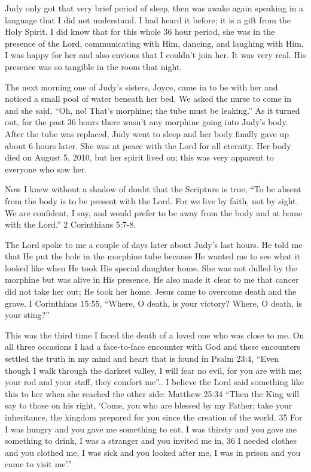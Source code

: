 \documentclass[twoside, 12pt]{book}
\begin{document}
Judy only got that very  brief period of sleep, then was awake again speaking in a language that I did not understand. I had heard it before; it is a gift from the Holy Spirit. I did know that for this whole 36 hour period, she was in the presence of the Lord, communicating with Him, dancing, and laughing with Him. I was happy for her and also envious that I couldn’t join her. It was very real. His presence was so tangible in the room that night. 

The next morning one of Judy’s sisters, Joyce, came in to be with her and noticed a small pool of water beneath her bed. We asked the nurse to come in and she said, “Oh, no! That’s morphine; the tube must be leaking.” As it turned out, for the past 36 hours there wasn’t any morphine going into Judy’s body. After the tube was replaced, Judy went to sleep and her body finally gave up about 6 hours later. She was at peace with the Lord for all eternity. Her body died on August 5, 2010, but her spirit lived on; this was very apparent to everyone who saw her.

Now I knew without a shadow of doubt that the Scripture is true, “To be absent from the body is to be present with the Lord. For we live by faith, not by sight. We are confident, I say, and would prefer to be away from the body and at home with the Lord.” 2 Corinthians 5:7-8.

The Lord spoke to me a couple of days later about Judy’s last hours. He told me that He put the hole in the morphine tube because He wanted me to see what it looked like when He took His special daughter home. She was not dulled by the morphine but was alive in His presence. He also made it clear to me that cancer did not take her out; He took her home. Jesus came to overcome death and the grave. I Corinthians 15:55, “Where, O death, is your victory? Where, O death, is your sting?”

This was the third time I faced the death of a loved one who was close to me. On all three occasions I had a face-to-face encounter with God and these encounters settled the truth in my mind and heart that is found in Psalm 23:4, “Even though I walk through the darkest valley, I will fear no evil, for you are with me; your rod and your staff, they comfort me”.. I believe the Lord said something like this to her when she reached the other side:  Matthew 25:34 “Then the King will say to those on his right, ‘Come, you who are blessed by my Father; take your inheritance, the kingdom prepared for you since the creation of the world. 35 For I was hungry and you gave me something to eat, I was thirsty and you gave me something to drink, I was a stranger and you invited me in, 36 I needed clothes and you clothed me, I was sick and you looked after me, I was in prison and you came to visit me’.” 
\end{document}
